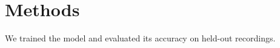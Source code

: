 \documentclass{article}
\begin{document}
\section{Methods}
We trained the model and evaluated its accuracy on held-out recordings.
\end{document}
